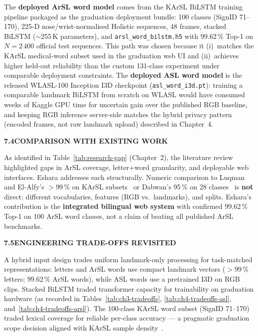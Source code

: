 \noindent The \textbf{deployed ArSL word model} comes from the KArSL BiLSTM training pipeline packaged as the graduation deployment bundle: 100 classes (SignID 71--170), 225-D nose/wrist-normalised Holistic sequences, 48 frames, stacked BiLSTM ($\sim$255\,K parameters), and \texttt{arsl\_word\_bilstm.h5} with 99.62\,\% Top-1 on $N{=}2\,400$ official test sequences. This path was chosen because it (i)~matches the KArSL medical-word subset used in the graduation web UI and (ii)~achieves higher held-out reliability than the custom 131-class experiment under comparable deployment constraints. The \textbf{deployed ASL word model} is the released WLASL-100 Inception I3D checkpoint (\texttt{asl\_word\_i3d.pt}): training a comparable landmark BiLSTM from scratch on WLASL would have consumed weeks of Kaggle GPU time for uncertain gain over the published RGB baseline, and keeping RGB inference server-side matches the hybrid privacy pattern (encoded frames, not raw landmark upload) described in Chapter~4.\par\vspace{0.3cm}

\noindent\textbf{7.4\quad COMPARISON WITH EXISTING WORK}\par
{}
\vspace{0.2cm}

\noindent As identified in Table~\ref{tab:research-gap} (Chapter~2), the literature review highlighted gaps in ArSL coverage, letter+word granularity, and deployable web interfaces. Eshara addresses each structurally. Numeric comparison to Luqman and El-Alfy's $>$99\,\% on KArSL subsets~\cite{luqman2022cascaded} or Dabwan's 95\,\% on 28 classes~\cite{dabwan2023cnnlstm} is \textbf{not} direct: different vocabularies, features (RGB vs.\ landmarks), and splits. Eshara's contribution is the \textbf{integrated bilingual web system} with confirmed 99.62\,\% Top-1 on 100 ArSL word classes, not a claim of beating all published ArSL benchmarks.\par\vspace{0.3cm}

\noindent\textbf{7.5\quad ENGINEERING TRADE-OFFS REVISITED}\par
{}
\vspace{0.2cm}

\noindent A hybrid input design trades uniform landmark-only processing for task-matched representations: letters and ArSL words use compact landmark vectors ($>$99\,\% letters; 99.62\,\% ArSL words), while ASL words use a pretrained I3D on RGB clips. Stacked BiLSTM traded transformer capacity for trainability on graduation hardware (as recorded in Tables~\ref{tab:ch3-tradeoffs}, \ref{tab:ch4-tradeoffs-asl}, and~\ref{tab:ch4-tradeoffs-arsl}). The 100-class KArSL word subset (SignID 71--170) traded lexical coverage for reliable per-class accuracy --- a pragmatic graduation scope decision aligned with KArSL sample density~\cite{sandler2018mobilenetv2,hochreiter1997long,sidig2021karsl}.\par\vspace{0.3cm}

